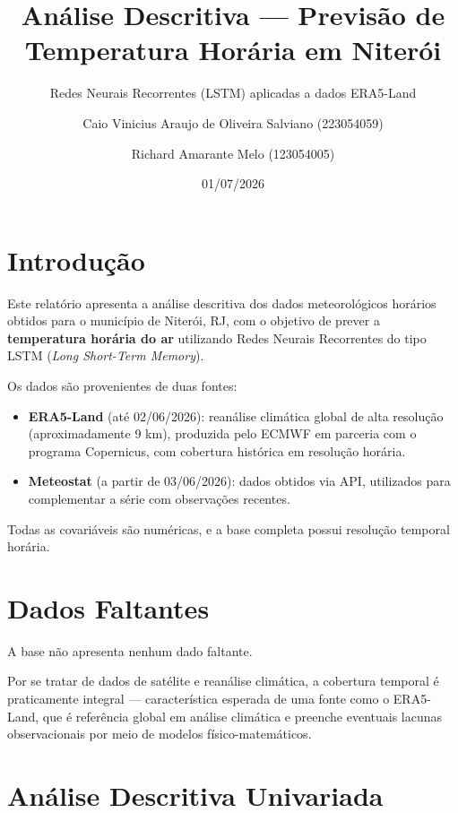 \documentclass[
  brazilian,
  a4paper,
]{article}
\title{Análise Descritiva --- Previsão de Temperatura Horária em
Niterói}
\subtitle{Redes Neurais Recorrentes (LSTM) aplicadas a dados ERA5-Land}
\author{Caio Vinicius Araujo de Oliveira Salviano
(223054059) \and Richard Amarante Melo (123054005)}
\date{01/07/2026}
\providecommand{\tightlist}{%
  \setlength{\itemsep}{0pt}\setlength{\parskip}{0pt}}
\renewcommand*\contentsname{Índice}
\newcommand\contentsname{Índice}
\begin{document}
\maketitle

\renewcommand*\contentsname{Sumário}
{
\setcounter{tocdepth}{3}
\tableofcontents
}

\section{Introdução}\label{introduuxe7uxe3o}

Este relatório apresenta a análise descritiva dos dados meteorológicos
horários obtidos para o município de Niterói, RJ, com o objetivo de
prever a \textbf{temperatura horária do ar} utilizando Redes Neurais
Recorrentes do tipo LSTM (\emph{Long Short-Term Memory}).

Os dados são provenientes de duas fontes:

\begin{itemize}
\tightlist
\item
  \textbf{ERA5-Land} (até 02/06/2026): reanálise climática global de
  alta resolução (aproximadamente 9 km), produzida pelo ECMWF em
  parceria com o programa Copernicus, com cobertura histórica em
  resolução horária.
\item
  \textbf{Meteostat} (a partir de 03/06/2026): dados obtidos via API,
  utilizados para complementar a série com observações recentes.
\end{itemize}

Todas as covariáveis são numéricas, e a base completa possui resolução
temporal horária.

\section{Dados Faltantes}\label{dados-faltantes}

A base não apresenta nenhum dado faltante.

Por se tratar de dados de satélite e reanálise climática, a cobertura
temporal é praticamente integral --- característica esperada de uma
fonte como o ERA5-Land, que é referência global em análise climática e
preenche eventuais lacunas observacionais por meio de modelos
físico-matemáticos.

\section{Análise Descritiva
Univariada}\label{anuxe1lise-descritiva-univariada}
\end{document}
